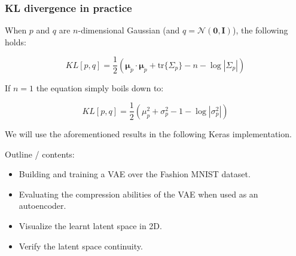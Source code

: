 \begin{frame}
    \frametitle{KL divergence in practice}
    When $p$ and $q$ are $n$-dimensional Gaussian (and $q=\mathcal{N}(\textbf{0},\textbf{I})$), the following holds:

    $$KL[p,q] = \frac 1 2 \left(\bm{\mu}_p \cdot \bm{\mu}_p + \text{tr}\{\Sigma_p\} - n - \log{|\Sigma_p|}\right)$$

    If $n=1$ the equation simply boils down to:

    $$KL[p,q] = \frac 1 2 \left(\mu_p^2 + \sigma^2_p - 1 - \log{|\sigma^2_p|}\right)$$

    We will use the aforementioned results in the following Keras implementation.
\end{frame}

\begin{colab}
    Outline / contents:
    \begin{itemize}
        \item Building and training a VAE over the Fashion MNIST dataset.
        \item Evaluating the compression abilities of the VAE when used as an autoencoder.
        \item Visualize the learnt latent space in 2D.
        \item Verify the latent space continuity.
    \end{itemize}
\end{colab}